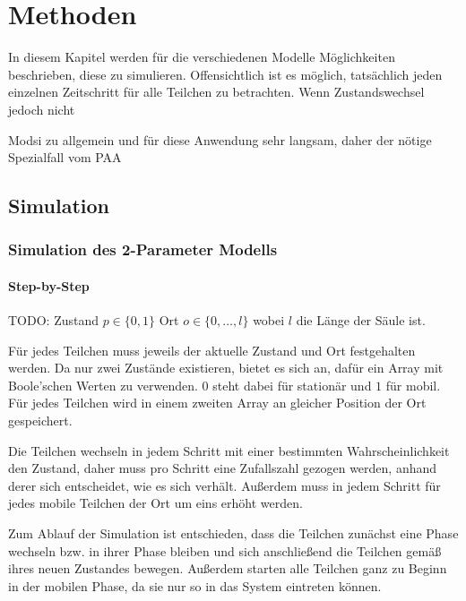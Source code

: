 \chapter{Methoden} 
\label{chapter:meth}

In diesem Kapitel werden für die verschiedenen Modelle Möglichkeiten beschrieben, diese zu simulieren. Offensichtlich ist es möglich, tatsächlich jeden einzelnen Zeitschritt für alle Teilchen zu betrachten. Wenn Zustandswechsel jedoch nicht  

Modsi zu allgemein und für diese Anwendung sehr langsam, daher der nötige Spezialfall vom PAA



\section{Simulation}

\subsection{Simulation des 2-Parameter Modells}
\subsubsection{Step-by-Step}
TODO: Zustand $p \in \{0, 1\}$ Ort $o \in \{0, \ldots, l\}$ wobei $l$ die Länge der Säule ist.

Für jedes Teilchen muss jeweils der aktuelle Zustand und Ort festgehalten werden. Da nur zwei Zustände existieren, bietet es sich an, dafür ein Array mit Boole'schen Werten zu verwenden. $0$ steht dabei für stationär und $1$ für mobil. Für jedes Teilchen wird in einem zweiten Array an gleicher Position der Ort gespeichert. 

Die Teilchen wechseln in jedem Schritt mit einer bestimmten Wahrscheinlichkeit den Zustand, daher muss pro Schritt eine Zufallszahl gezogen werden, anhand derer sich entscheidet, wie es sich verhält. Außerdem muss in jedem Schritt für jedes mobile Teilchen der Ort um eins erhöht werden.

Zum Ablauf der Simulation ist entschieden, dass die Teilchen zunächst eine Phase wechseln bzw. in ihrer Phase bleiben und sich anschließend die Teilchen gemäß ihres neuen Zustandes bewegen. Außerdem starten alle Teilchen ganz zu Beginn in der mobilen Phase, da sie nur so in das System eintreten können.

